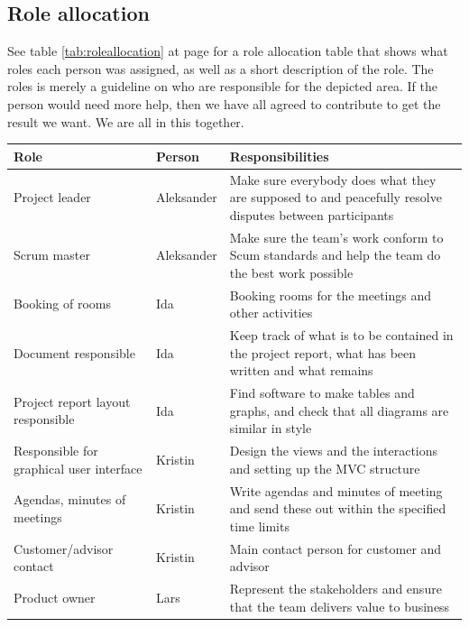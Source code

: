 \subsection{Role allocation}
See table \ref{tab:roleallocation} at page \pageref{tab:roleallocation} for a role allocation table that shows what roles each person was assigned, as well as a short description of the role. The roles is merely a guideline on who are responsible for the depicted area. If the person would need more help, then we have all agreed to contribute to get the result we want. We are all in this together.
\begin{table}[hbt]
\begin{center}
\begin{tabularx}{\linewidth}{>{\setlength\hsize{.5\hsize}}X|>{\setlength\hsize{0.3\hsize}}X|>{\setlength\hsize{1\hsize}}X} \hline
\textbf{Role} & \textbf{Person} & \textbf{Responsibilities} \\ \hline \hline

Project leader & Aleksander & Make sure everybody does what they are supposed to and peacefully resolve disputes between participants \\  \hline
Scrum master & Aleksander & Make sure the team’s work conform to Scum standards and help the team do the best work possible \\ \hline

Booking of rooms & Ida & Booking rooms for the meetings and other activities \\ \hline
Document responsible & Ida &Keep track of what is to be contained in the project report, what has been written and what remains \\ \hline
Project report layout responsible & Ida &Find software to make tables and graphs, and check that all diagrams are similar in style \\ \hline

Responsible for graphical user interface & Kristin & Design the views and the interactions and setting up the MVC structure \\ \hline
Agendas, minutes of meetings & Kristin &Write agendas and minutes of meeting and send these out within the specified time limits \\ \hline
Customer/advisor contact & Kristin & Main contact person for customer and advisor \\ \hline

Product owner & Lars & Represent the stakeholders and ensure that the team delivers value to business\\ \hline


\end{tabularx}
\end{center}
\end{table}
